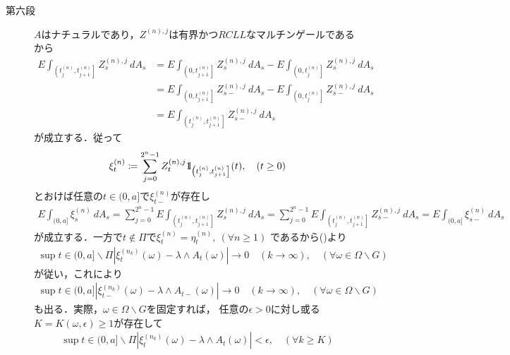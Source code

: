 \begin{prf}
\begin{description}
			\item[第六段]
				$A$はナチュラルであり，$Z^{(n),j}$は有界かつ$RCLL$なマルチンゲールであるから
				\begin{align}
					E\int_{\left(t^{(n)}_j,t^{(n)}_{j+1}\right]} Z^{(n),j}_s\ dA_s
					&= E\int_{\left(0,t^{(n)}_{j+1}\right]} Z^{(n),j}_s\ dA_s
						- E\int_{\left(0,t^{(n)}_j\right]} Z^{(n),j}_s\ dA_s \\
					&= E\int_{\left(0,t^{(n)}_{j+1}\right]} Z^{(n),j}_{s-}\ dA_s
						- E\int_{\left(0,t^{(n)}_j\right]} Z^{(n),j}_{s-}\ dA_s \\
					&= E\int_{\left(t^{(n)}_j,t^{(n)}_{j+1}\right]} Z^{(n),j}_{s-}\ dA_s
				\end{align}
				が成立する．従って
				\begin{align}
					\xi^{(n)}_t \coloneqq
					\sum_{j=0}^{2^n-1} Z^{(n),j}_t \mbox{1}\hspace{-0.25em}\mbox{l}_{\left(t^{(n)}_j,t^{(n)}_{j+1}\right]}(t),
					\quad (t \geq 0)
				\end{align}
				とおけば任意の$t \in (0,a]$で$\xi^{(n)}_{t-}$が存在し
				\begin{align}
					E\int_{(0,a]} \xi^{(n)}_s\ dA_s
					= \sum_{j=0}^{2^n-1} E\int_{\left(t^{(n)}_j,t^{(n)}_{j+1}\right]} Z^{(n),j}_s\ dA_s
					= \sum_{j=0}^{2^n-1} E\int_{\left(t^{(n)}_j,t^{(n)}_{j+1}\right]} Z^{(n),j}_{s-}\ dA_s
					= E\int_{(0,a]} \xi^{(n)}_{s-}\ dA_s
				\end{align}
				が成立する．一方で$t \notin \Pi$で$\xi^{(n)}_t = \eta^{(n)}_t,\ (\forall n \geq 1)$
				であるから()より
				\begin{align}
					\sup{t \in (0,a]\backslash\Pi}{\left|\xi^{(n_k)}_t(\omega) - \lambda \wedge A_t(\omega)\right|}
					\longrightarrow 0 \quad (k \longrightarrow \infty),
					\quad (\forall \omega \in \Omega \backslash G)
				\end{align}
				が従い，これにより
				\begin{align}
					\sup{t \in (0,a]}{\left|\xi^{(n_k)}_{t-}(\omega) - \lambda \wedge A_{t-}(\omega)\right|}
					\longrightarrow 0 \quad (k \longrightarrow \infty),
					\quad (\forall \omega \in \Omega \backslash G)
				\end{align}
				も出る．実際，$\omega \in \Omega \backslash G$を固定すれば，
				任意の$\epsilon > 0$に対し或る$K = K(\omega,\epsilon) \geq 1$が存在して
				\begin{align}
					\sup{t \in (0,a]\backslash\Pi}{\left|\xi^{(n_k)}_t(\omega) - \lambda \wedge A_t(\omega)\right|} 
					< \epsilon,\quad (\forall k \geq K)
				\end{align}

\end{description}
\end{prf}
